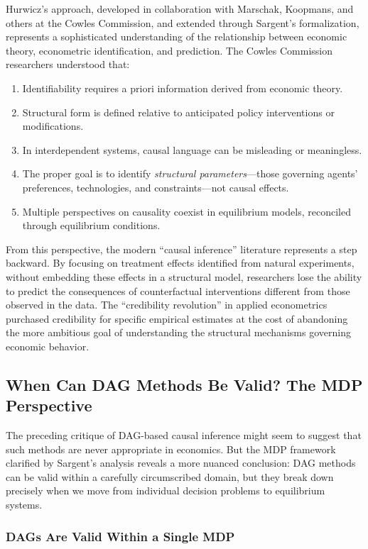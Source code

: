 \documentclass[12pt]{article}
\begin{document}
Hurwicz's approach, developed in collaboration with Marschak, Koopmans, and others at the Cowles Commission, and extended through Sargent's formalization, represents a sophisticated understanding of the relationship between economic theory, econometric identification, and prediction. The Cowles Commission researchers understood that:
\begin{enumerate}
\item Identifiability requires a priori information derived from economic theory.
\item Structural form is defined relative to anticipated policy interventions or modifications.
\item In interdependent systems, causal language can be misleading or meaningless.
\item The proper goal is to identify \emph{structural parameters}---those governing agents' preferences, technologies, and constraints---not causal effects.
\item Multiple perspectives on causality coexist in equilibrium models, reconciled through equilibrium conditions.
\end{enumerate}

From this perspective, the modern ``causal inference'' literature represents a step backward. By focusing on treatment effects identified from natural experiments, without embedding these effects in a structural model, researchers lose the ability to predict the consequences of counterfactual interventions different from those observed in the data. The ``credibility revolution'' in applied econometrics purchased credibility for specific empirical estimates at the cost of abandoning the more ambitious goal of understanding the structural mechanisms governing economic behavior.


\subsection{When Can DAG Methods Be Valid? The MDP Perspective}

The preceding critique of DAG-based causal inference might seem to suggest that such methods are never appropriate in economics. But the MDP framework clarified by Sargent's analysis reveals a more nuanced conclusion: DAG methods can be valid within a carefully circumscribed domain, but they break down precisely when we move from individual decision problems to equilibrium systems.

\subsubsection{DAGs Are Valid Within a Single MDP}
\end{document}
